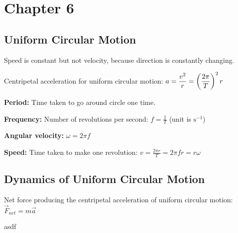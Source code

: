 \section{Chapter 6}

\subsection{Uniform Circular Motion}

Speed is constant but not velocity, because direction is constantly changing.

Centripetal acceleration for uniform circular motion:
$\displaystyle a = \frac{v^2}{r} = \left(\frac{2\pi}{T}\right)^2 r$

\textbf{Period:} Time taken to go around circle one time.

\textbf{Frequency:} Number of revolutions per second: $\displaystyle f = \frac{1}{T}$ (unit is $\mathrm{s}^{-1}$)

\textbf{Angular velocity:} $\omega = 2\pi f$

\textbf{Speed:} Time taken to make one revolution: $\displaystyle v = \frac{2\pi r}{T} = 2\pi fr = r\omega$

\subsection{Dynamics of Uniform Circular Motion}

Net force producing the centripetal acceleration of uniform circular motion:
$\displaystyle \Vec{F}_{net} = m\Vec{a}$

asdf
